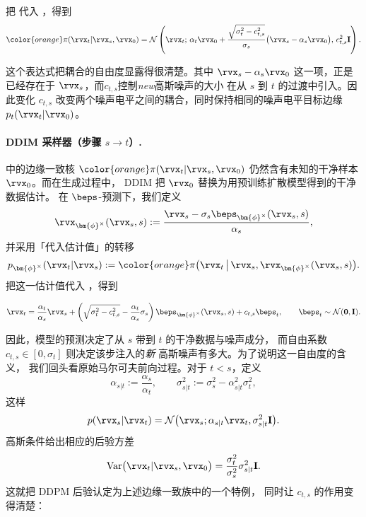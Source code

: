 把  代入 ，得到
\begin{align}
\label{eq:ddim-reverse-kernel-result}
{\color{orange}\pi(\rvx_t|\rvx_s,\rvx_0)}
=
\mathcal{N}
\left(
\rvx_t;\,
\alpha_t\rvx_0
+
\frac{
\sqrt{\sigma_t^2-c_{t,s}^2}
}{
\sigma_s
}
\bigl(
\rvx_s-\alpha_s\rvx_0
\bigr),
\,
c_{t,s}^2\mathbf{I}
\right).
\end{align}

这个表达式把耦合的自由度显露得很清楚。其中 $\rvx_s-\alpha_s\rvx_0$ 这一项，正是已经存在于
$\rvx_s$，而$c_{t,s}$控制\emph{new}高斯噪声的大小
在从 $s$ 到 $t$ 的过渡中引入。因此变化 $c_{t,s}$
改变两个噪声电平之间的耦合，同时保持相同的噪声电平目标边缘 $p_t(\rvx_t|\rvx_0)$。



\paragraph{DDIM 采样器（步骤 $s\to t$）.}
 中的边缘一致核
${\color{orange}\pi(\rvx_t|\rvx_s,\rvx_0)}$
仍然含有未知的干净样本 $\rvx_0$。而在生成过程中，
DDIM 把 $\rvx_0$ 替换为用预训练扩散模型得到的干净数据估计。
在 $\beps$-预测下，我们定义
\[
\rvx_{\bm{\phi}^\times}(\rvx_s,s)
:=
\frac{
\rvx_s
-
\sigma_s\beps_{\bm{\phi}^\times}(\rvx_s,s)
}{
\alpha_s
},
\]
并采用「代入估计值」的转移
\[
p_{\bm{\phi}^\times}(\rvx_t|\rvx_s)
:=
{\color{orange}\pi
\bigl(
\rvx_t
\,\big|\,
\rvx_s,
\rvx_{\bm{\phi}^\times}(\rvx_s,s)
\bigr)}.
\]
把这一估计值代入
，得到
\begin{mdframed}
\[
\rvx_t
=
\frac{\alpha_t}{\alpha_s}\rvx_s
+
\left(
\sqrt{\sigma_t^2-c_{t,s}^2}
-
\frac{\alpha_t}{\alpha_s}\sigma_s
\right)
\beps_{\bm{\phi}^\times}(\rvx_s,s)
+
c_{t,s}\beps_t,
\qquad
\beps_t\sim\mathcal{N}(\mathbf{0},\mathbf{I}).
\]
\end{mdframed}
因此，模型的预测决定了从 $s$ 带到 $t$ 的干净数据与噪声成分，
而自由系数 $c_{t,s}\in[0,\sigma_t]$ 则决定该步注入的\emph{新}
高斯噪声有多大。为了说明这一自由度的含义，
我们回头看原始马尔可夫前向过程。对于 $t<s$，定义
\[
\alpha_{s|t}
:=
\frac{\alpha_s}{\alpha_t},
\qquad
\sigma_{s|t}^2
:=
\sigma_s^2-\alpha_{s|t}^2\sigma_t^2,
\]
这样
\[
p(\rvx_s|\rvx_t)
=
\mathcal{N}
\bigl(
\rvx_s;
\alpha_{s|t}\rvx_t,
\sigma_{s|t}^2\mathbf I
\bigr).
\]
高斯条件给出相应的后验方差
\[
\operatorname{Var}
\bigl(
\rvx_t|\rvx_s,\rvx_0
\bigr)
=
\frac{\sigma_t^2}{\sigma_s^2}
\sigma_{s|t}^2\mathbf I.
\]
这就把 DDPM 后验认定为上述边缘一致族中的一个特例，
同时让 $c_{t,s}$ 的作用变得清楚：

